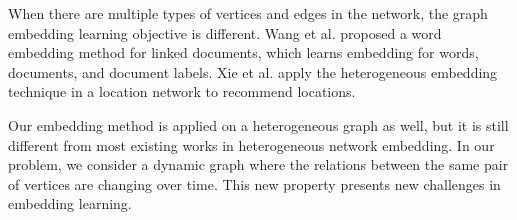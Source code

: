 When there are multiple types of vertices and edges in the network, the graph embedding learning objective is different. Wang et al. \cite{wang2016linked} proposed a word embedding method for linked documents, which learns embedding for words, documents, and document labels. Xie et al. \cite{xie2016learning} apply the heterogeneous embedding technique in a location network to recommend locations.


Our embedding method is applied on a heterogeneous graph as well, but it is still different from most existing works in heterogeneous network embedding. In our problem, we consider a dynamic graph where the relations between the same pair of vertices are changing over time. This new property presents new challenges in embedding learning.

